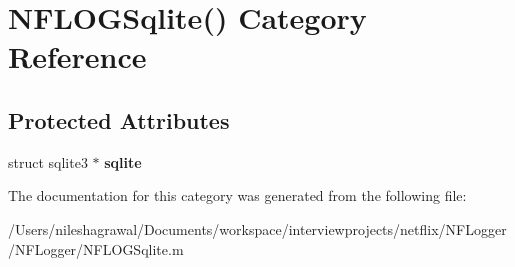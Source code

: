 \hypertarget{category_n_f_l_o_g_sqlite_07_08}{}\section{N\+F\+L\+O\+G\+Sqlite() Category Reference}
\label{category_n_f_l_o_g_sqlite_07_08}
\subsection*{Protected Attributes}
\begin{DoxyCompactItemize}
\item 
\mbox{\label{category_n_f_l_o_g_sqlite_07_08_a792b9d5086c9a597b4fc07eb006ea521}} 
struct sqlite3 $\ast$ {\bfseries sqlite}
\end{DoxyCompactItemize}


The documentation for this category was generated from the following file\+:\begin{DoxyCompactItemize}
\item 
/\+Users/nileshagrawal/\+Documents/workspace/interviewprojects/netflix/\+N\+F\+Logger/\+N\+F\+Logger/N\+F\+L\+O\+G\+Sqlite.\+m\end{DoxyCompactItemize}
